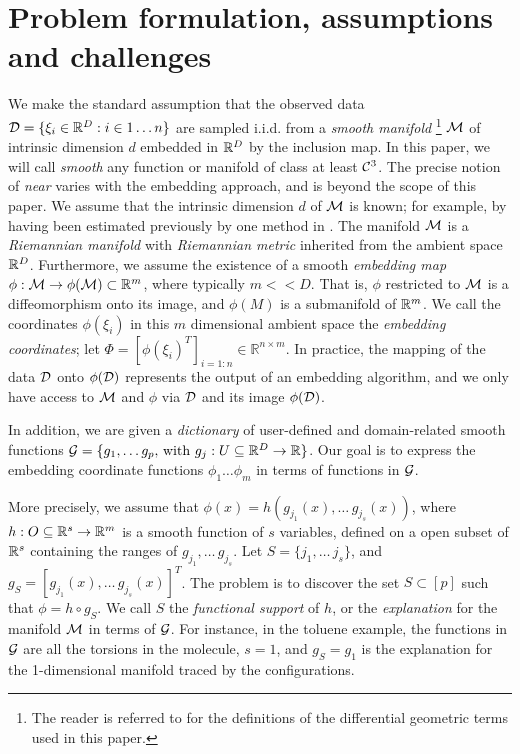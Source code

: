 \section{Problem formulation, assumptions and challenges}
\label{sec:problem}
We make the standard assumption that the observed data
${\cal D}=\{\xi_i \in {\mathbb R}^D : i \in 1 \dotsc n\}$ are sampled
i.i.d. from a {\em smooth manifold} \footnote{The reader is referred
  to \citet{smoothmfd} for the definitions of the differential
  geometric terms used in this paper.} ${\cal M}$ of intrinsic dimension $d$
embedded in ${\mathbb R}^D$ by the inclusion map. In this
paper, we will call {\em smooth} any function or manifold of class at
least ${\cal C}^3$. The precise notion of {\em near} varies with
  the embedding approach, and is beyond the scope of this paper. We
assume that the intrinsic dimension $d$ of ${\cal M}$ is known; for example,
by having been estimated previously by one method in
\citet{Kleindessner2015DimensionalityEW}. The manifold ${\cal M}$ is a {\em
  Riemannian manifold} with {\em Riemannian metric} inherited from the
ambient space ${\mathbb R}^D$. Furthermore, we assume the existence of a
smooth {\em embedding map} $\phi:{\cal M}\rightarrow \phi({\cal M})\subset{\mathbb R}^m$,
where typically $m << D$.  That is, $\phi$ restricted to ${\cal M}$ is
  a diffeomorphism onto its image, and $\phi(M)$ is a submanifold of
  ${\mathbb R}^m$.  We call the coordinates $\phi(\xi_i)$ in this $m$
dimensional ambient space the {\em embedding coordinates}; let $\Phi =
[\phi(\xi_i)^T]_{i=1:n} \in \mathbb R^{n\times m}$.  In practice, the
mapping of the data ${\cal D}$ onto $\phi({\cal D})$ represents the
output of an embedding algorithm, and we only have access to ${\cal M}$ and
$\phi$ via ${\cal D}$ and its image $\phi({\cal D})$.

In addition, we are given a {\em dictionary} of user-defined and domain-related smooth functions ${\cal G}=\{g_1,\ldots g_p,\,\text{with }g_j: U \subseteq {\mathbb R}^D \rightarrow {\mathbb R}\}$. Our goal is to express the embedding coordinate functions 
$\phi_1 \dotsc \phi_m$ in terms of functions in ${\cal G}$.

More precisely, we assume that
$\phi(x)=h(g_{j_1}(x),\ldots\,g_{j_s}(x))$, where $h:O\subseteq
{\mathbb R}^s\rightarrow {\mathbb R}^m$ is a smooth function of $s$ variables, defined
on a open subset of ${\mathbb R}^s$ containing the ranges of
$g_{j_1},\ldots\,g_{j_s}$. Let $S=\{{j_1},\ldots\,{j_s}\}$, and
$g_S=[g_{j_1}(x),\ldots\,g_{j_s}(x)]^T$. The problem is to discover the
set $S\subset [p]$ such that $\phi=h\circ g_S$. We call $S$ the {\em
  functional support} of $h$, or the {\em explanation} for the
manifold ${\cal M}$ in terms of ${\cal G}$. For instance, in the toluene
example, the functions in ${\cal G}$ are all the torsions in the
molecule, $s=1$, and $g_S=g_1$ is the explanation for the
1-dimensional manifold traced by the configurations.

